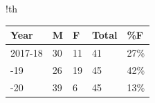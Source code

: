 

\begin{tabbox}[7.5cm]{!th}
\caption{Number of postgraduate students registered from 2017-18 to 2019-20 by  gender}
\label{tab:phdregistrations}
\footnotesize 



\begin{tabular}{p{3cm}
                R{1cm}
                C{1.2cm}           
                C{1.3cm}
                R{1cm}
                }
\toprule                 
\textmd{Year}&
\textmd{M}&
\textmd{F}&
\textmd{Total}&
\textmd{\%F}\\ 
-18&30 &11 &41 & 27\%\\
-19&26 &19 &45 & 42\%\\
-20&39 &6 &45 & 13\%\\
\bottomrule 
\end{tabular}


\end{tabbox}


